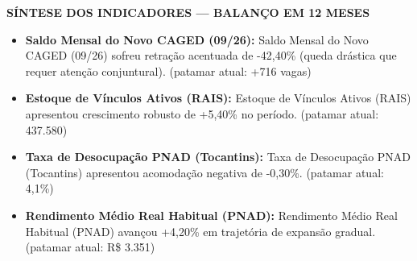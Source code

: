 \documentclass[10pt,a4paper]{article}
\begin{document}
{\begin{tikzpicture}[baseline=(box.base)]
\end{tikzpicture}\hfill%
%
}

\vspace{0.03cm}
\par\vspace{0.05cm}
\par\vspace{4pt}
{\fontsize{7.8}{9.4}\selectfont\bfseries\color{corprimaria}\MakeUppercase{Síntese dos Indicadores — Balanço em 12 Meses}}\par\vspace{2pt}
{\scriptsize\color{cinzatexto}
\begin{itemize}[leftmargin=10pt, itemsep=1.2pt, topsep=1pt, parsep=0pt]
   \item \textbf{\color{corprimaria}Saldo Mensal do Novo CAGED (09/26):} Saldo Mensal do Novo CAGED (09/26) sofreu retração acentuada de -42,40\% (queda drástica que requer atenção conjuntural). (patamar atual: +716 vagas)
   \item \textbf{\color{corprimaria}Estoque de Vínculos Ativos (RAIS):} Estoque de Vínculos Ativos (RAIS) apresentou crescimento robusto de +5,40\% no período. (patamar atual: 437.580)
   \item \textbf{\color{corprimaria}Taxa de Desocupação PNAD (Tocantins):} Taxa de Desocupação PNAD (Tocantins) apresentou acomodação negativa de -0,30\%. (patamar atual: 4,1\%)
   \item \textbf{\color{corprimaria}Rendimento Médio Real Habitual (PNAD):} Rendimento Médio Real Habitual (PNAD) avançou +4,20\% em trajetória de expansão gradual. (patamar atual: R\$ 3.351)
\end{itemize}
}
\par\vspace{0.05cm}
\end{document}
